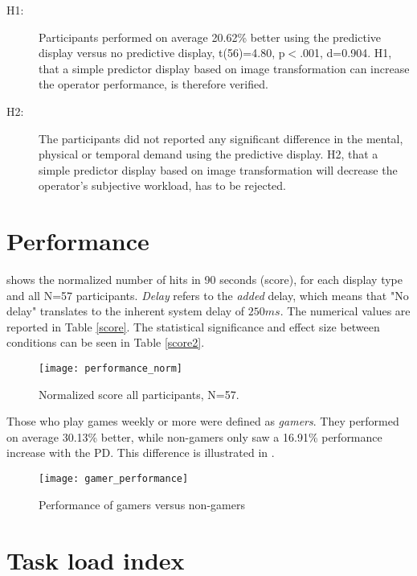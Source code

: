 \begin{description}
\item[H1:] Participants performed on average 20.62\% better using the predictive display versus no predictive display, t(56)=4.80, p$<$.001, d=0.904. H1, that a simple predictor display based on image transformation can increase the operator performance, is therefore verified.

\item[H2:] The participants did not reported any significant difference in the mental, physical or temporal demand using the predictive display. H2, that a simple predictor display based on image transformation will decrease the operator's subjective workload, has to be rejected. 
\end{description}
\vspace{-5mm}
\section{Performance}

 shows the normalized number of hits in 90 seconds (score), for each display type and all N=57 participants. \textit{Delay} refers to the \textit{added} delay, which means that "No delay" translates to the inherent system delay of $250 ms$. The numerical values are reported in Table \ref{score}. The statistical significance and effect size between conditions can be seen in Table \ref{score2}.

\begin{figure}[h!]
    \centering
    \texttt{[image: performance\_norm]}
    \caption{Normalized score all participants, N=57.}
    \label{performanceNorm}
	\vspace{-0.2cm}
\end{figure}

Those who play games weekly or more were defined as \emph{gamers}. They performed on average 30.13\% better, while non-gamers only saw a 16.91\% performance increase with the PD. This difference is illustrated in .




\begin{figure}[h!]
    \centering
    \texttt{[image: gamer\_performance]}
    \caption{Performance of gamers versus non-gamers}
    \label{gamer_performance}
\end{figure}

\clearpage
\section{Task load index}


